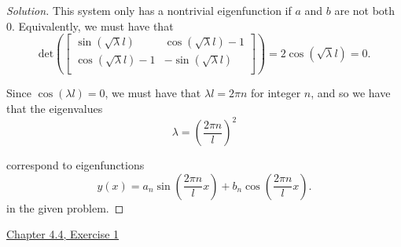 \documentclass[11pt]{article}
\newenvironment{solution}
  {\renewcommand\qedsymbol{$\blacksquare$}\begin{proof}[Solution]}
  {\end{proof}}
\begin{document}
\begin{solution}
This system only has a nontrivial eigenfunction if $a$ and $b$ are not both $0$. Equivalently, we must have that
\[ \mathrm{det} \left( \begin{bmatrix}
    \sin(\sqrt{\lambda} l) & \cos(\sqrt{\lambda} l) - 1 \\
    \cos(\sqrt{\lambda} l) - 1 & -\sin(\sqrt{\lambda} l) \\
    \end{bmatrix} \right) = 2\cos(\sqrt{\lambda} l) = 0. \]

Since $\cos(\lambda l) = 0$, we must have that $\lambda l = 2\pi n$ for integer $n$, and so we have that the eigenvalues 
\[\boxed{\lambda = \left( \frac{2\pi n}{l}\right)^2}\] 

correspond to eigenfunctions \[ \boxed{y(x) = a_n \sin \left( \frac{2\pi n}{l} x\right) + b_n \cos \left( \frac{2\pi n}{l} x\right)}.\]
in the given problem. \end{solution}

\newpage

\underline{Chapter 4.4, Exercise 1} \\
\end{document}
